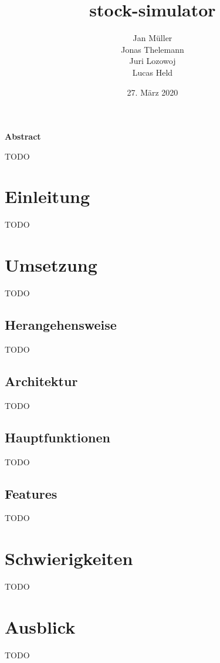 \documentclass[a4paper]{article}
\renewenvironment{abstract}
{\normalsize
    \begin{flushleft}
        \Large\bfseries\abstractname
    \end{flushleft}
    \list{}{
        \setlength{\leftmargin}{0pt}
    }
    \item\relax
}
{\endlist}
\begin{document}
\title{\textbf{stock-simulator}}
\author{
    Jan Müller\\
    Jonas Thelemann\\
    Juri Lozowoj\\
    Lucas Held
}
\date{27. März 2020}
\maketitle

\renewcommand{\abstractname}{Abstract}  %
\begin{abstract}
TODO
\end{abstract}

\pagebreak
\tableofcontents
\pagebreak


\section{Einleitung}
TODO


\section{Umsetzung}
TODO


\subsection{Herangehensweise}
TODO


\subsection{Architektur}
TODO


\subsection{Hauptfunktionen}
TODO


\subsection{Features}
TODO


\section{Schwierigkeiten}
TODO


\section{Ausblick}
TODO
\end{document}

